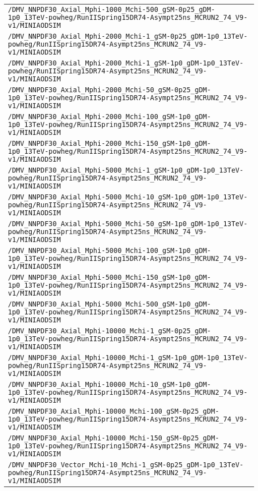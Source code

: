 \begin{center}
\begin{tabular}{l}
\verb!/DMV_NNPDF30_Axial_Mphi-1000_Mchi-500_gSM-0p25_gDM-1p0_13TeV-powheg/RunIISpring15DR74-Asympt25ns_MCRUN2_74_V9-v1/MINIAODSIM! \tabularnewline
\verb!/DMV_NNPDF30_Axial_Mphi-2000_Mchi-1_gSM-0p25_gDM-1p0_13TeV-powheg/RunIISpring15DR74-Asympt25ns_MCRUN2_74_V9-v1/MINIAODSIM! \tabularnewline
\verb!/DMV_NNPDF30_Axial_Mphi-2000_Mchi-1_gSM-1p0_gDM-1p0_13TeV-powheg/RunIISpring15DR74-Asympt25ns_MCRUN2_74_V9-v1/MINIAODSIM! \tabularnewline
\verb!/DMV_NNPDF30_Axial_Mphi-2000_Mchi-50_gSM-0p25_gDM-1p0_13TeV-powheg/RunIISpring15DR74-Asympt25ns_MCRUN2_74_V9-v1/MINIAODSIM! \tabularnewline
\verb!/DMV_NNPDF30_Axial_Mphi-2000_Mchi-100_gSM-1p0_gDM-1p0_13TeV-powheg/RunIISpring15DR74-Asympt25ns_MCRUN2_74_V9-v1/MINIAODSIM! \tabularnewline
\verb!/DMV_NNPDF30_Axial_Mphi-2000_Mchi-150_gSM-1p0_gDM-1p0_13TeV-powheg/RunIISpring15DR74-Asympt25ns_MCRUN2_74_V9-v1/MINIAODSIM! \tabularnewline
\verb!/DMV_NNPDF30_Axial_Mphi-5000_Mchi-1_gSM-1p0_gDM-1p0_13TeV-powheg/RunIISpring15DR74-Asympt25ns_MCRUN2_74_V9-v1/MINIAODSIM! \tabularnewline
\verb!/DMV_NNPDF30_Axial_Mphi-5000_Mchi-10_gSM-1p0_gDM-1p0_13TeV-powheg/RunIISpring15DR74-Asympt25ns_MCRUN2_74_V9-v1/MINIAODSIM! \tabularnewline
\verb!/DMV_NNPDF30_Axial_Mphi-5000_Mchi-50_gSM-1p0_gDM-1p0_13TeV-powheg/RunIISpring15DR74-Asympt25ns_MCRUN2_74_V9-v1/MINIAODSIM! \tabularnewline
\verb!/DMV_NNPDF30_Axial_Mphi-5000_Mchi-100_gSM-1p0_gDM-1p0_13TeV-powheg/RunIISpring15DR74-Asympt25ns_MCRUN2_74_V9-v1/MINIAODSIM! \tabularnewline
\verb!/DMV_NNPDF30_Axial_Mphi-5000_Mchi-150_gSM-1p0_gDM-1p0_13TeV-powheg/RunIISpring15DR74-Asympt25ns_MCRUN2_74_V9-v1/MINIAODSIM! \tabularnewline
\verb!/DMV_NNPDF30_Axial_Mphi-5000_Mchi-500_gSM-1p0_gDM-1p0_13TeV-powheg/RunIISpring15DR74-Asympt25ns_MCRUN2_74_V9-v1/MINIAODSIM! \tabularnewline
\verb!/DMV_NNPDF30_Axial_Mphi-10000_Mchi-1_gSM-0p25_gDM-1p0_13TeV-powheg/RunIISpring15DR74-Asympt25ns_MCRUN2_74_V9-v1/MINIAODSIM! \tabularnewline
\verb!/DMV_NNPDF30_Axial_Mphi-10000_Mchi-1_gSM-1p0_gDM-1p0_13TeV-powheg/RunIISpring15DR74-Asympt25ns_MCRUN2_74_V9-v1/MINIAODSIM! \tabularnewline
\verb!/DMV_NNPDF30_Axial_Mphi-10000_Mchi-10_gSM-1p0_gDM-1p0_13TeV-powheg/RunIISpring15DR74-Asympt25ns_MCRUN2_74_V9-v1/MINIAODSIM! \tabularnewline
\verb!/DMV_NNPDF30_Axial_Mphi-10000_Mchi-100_gSM-0p25_gDM-1p0_13TeV-powheg/RunIISpring15DR74-Asympt25ns_MCRUN2_74_V9-v1/MINIAODSIM! \tabularnewline
\verb!/DMV_NNPDF30_Axial_Mphi-10000_Mchi-150_gSM-0p25_gDM-1p0_13TeV-powheg/RunIISpring15DR74-Asympt25ns_MCRUN2_74_V9-v1/MINIAODSIM! \tabularnewline
\verb!/DMV_NNPDF30_Vector_Mchi-10_Mchi-1_gSM-0p25_gDM-1p0_13TeV-powheg/RunIISpring15DR74-Asympt25ns_MCRUN2_74_V9-v1/MINIAODSIM! \tabularnewline

\end{tabular}
\end{center}
